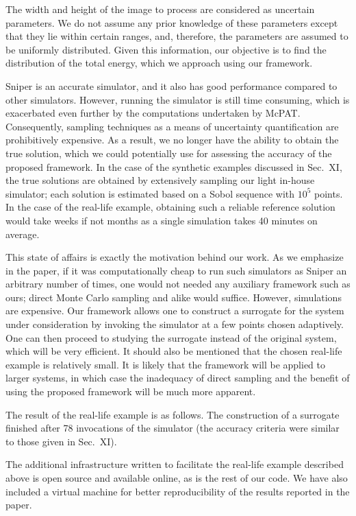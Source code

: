 \begin{authors}
The width and height of the image to process are considered as uncertain
parameters. We do not assume any prior knowledge of these parameters except that
they lie within certain ranges, and, therefore, the parameters are assumed to be
uniformly distributed. Given this information, our objective is to find the
distribution of the total energy, which we approach using our framework.

Sniper is an accurate simulator, and it also has good performance compared to
other simulators. However, running the simulator is still time consuming, which
is exacerbated even further by the computations undertaken by McPAT.
Consequently, sampling techniques as a means of uncertainty quantification are
prohibitively expensive. As a result, we no longer have the ability to obtain
the true solution, which we could potentially use for assessing the accuracy of
the proposed framework. In the case of the synthetic examples discussed in
Sec.~XI, the true solutions are obtained by extensively sampling our light
in-house simulator; each solution is estimated based on a Sobol sequence with
$10^5$ points. In the case of the real-life example, obtaining such a reliable
reference solution would take weeks if not months as a single simulation takes
40 minutes on average.

This state of affairs is exactly the motivation behind our work. As we emphasize
in the paper, if it was computationally cheap to run such simulators as Sniper
an arbitrary number of times, one would not needed any auxiliary framework such
as ours; direct Monte Carlo sampling and alike would suffice. However,
simulations are expensive. Our framework allows one to construct a surrogate for
the system under consideration by invoking the simulator at a few points chosen
adaptively. One can then proceed to studying the surrogate instead of the
original system, which will be very efficient. It should also be mentioned that
the chosen real-life example is relatively small. It is likely that the
framework will be applied to larger systems, in which case the inadequacy of
direct sampling and the benefit of using the proposed framework will be much
more apparent.

The result of the real-life example is as follows. The construction of a
surrogate finished after 78 invocations of the simulator (the accuracy criteria
were similar to those given in Sec.~XI).

The additional infrastructure written to facilitate the real-life example
described above is open source and available online, as is the rest of our code.
We have also included a virtual machine for better reproducibility of the
results reported in the paper.

\begin{actions}
\end{actions}
\end{authors}
